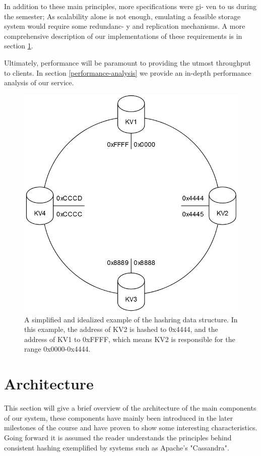 \documentclass[sigconf]{acmart}
\begin{document}
In addition to these main principles, more specifications were gi- ven to us during the semester; As scalability alone is not enough, emulating a feasible storage system would require some redundanc- y and replication mechanisms. A more comprehensive description of our implementations of these requirements is in section \ref{architecture-overview}.

Ultimately, performance will be paramount to providing the utmost throughput to clients. In section \ref{performance-analysis} we provide an in-depth performance analysis of our service.

\begin{center}
  \begin{figure}[htbp]
    \centerline{\includegraphics[scale=0.3]{attachments/hashring.png}}
    \caption{A simplified and idealized example of the hashring data structure. In this example, the address of KV2 is hashed to 0x4444, and the address of KV1 to 0xFFFF, which means KV2 is responsible for the range 0x0000-0x4444.}
    \label{fig00}
  \end{figure}
\end{center}

\section{Architecture}\label{architecture-overview}
This section will give a brief overview of the architecture of the main components of our system, these components have mainly been introduced in the later milestones of the course and have proven to show some interesting characteristics. Going forward it is assumed the reader understands the principles behind consistent hashing exemplified by systems such as Apache's "Cassandra".
\end{document}
